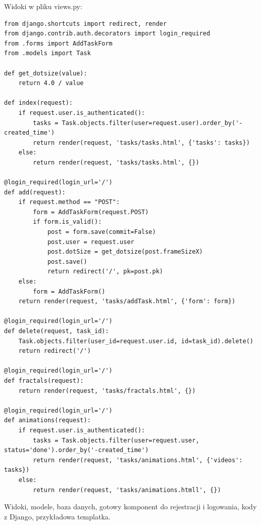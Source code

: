 \documentclass[a4paper]{article}
\begin{document}
Widoki w pliku views.py:
\begin{lstlisting}
from django.shortcuts import redirect, render
from django.contrib.auth.decorators import login_required
from .forms import AddTaskForm
from .models import Task

def get_dotsize(value):
    return 4.0 / value

def index(request):
    if request.user.is_authenticated():
        tasks = Task.objects.filter(user=request.user).order_by('-created_time')
        return render(request, 'tasks/tasks.html', {'tasks': tasks})
    else:
        return render(request, 'tasks/tasks.html', {})

@login_required(login_url='/')
def add(request):
    if request.method == "POST":
        form = AddTaskForm(request.POST)
        if form.is_valid():
            post = form.save(commit=False)
            post.user = request.user
            post.dotSize = get_dotsize(post.frameSizeX)
            post.save()
            return redirect('/', pk=post.pk)
    else:
        form = AddTaskForm()
    return render(request, 'tasks/addTask.html', {'form': form})

@login_required(login_url='/')
def delete(request, task_id):
    Task.objects.filter(user_id=request.user.id, id=task_id).delete()
    return redirect('/')

@login_required(login_url='/')
def fractals(request):
    return render(request, 'tasks/fractals.html', {})

@login_required(login_url='/')
def animations(request):
    if request.user.is_authenticated():
        tasks = Task.objects.filter(user=request.user, status='done').order_by('-created_time')
        return render(request, 'tasks/animations.html', {'videos': tasks})
    else:
        return render(request, 'tasks/animations.htmll', {})
\end{lstlisting}


Widoki, modele, baza danych, gotowy komponent do rejestracji i logowania, kody z Django, przykładowa templatka.
\end{document}
